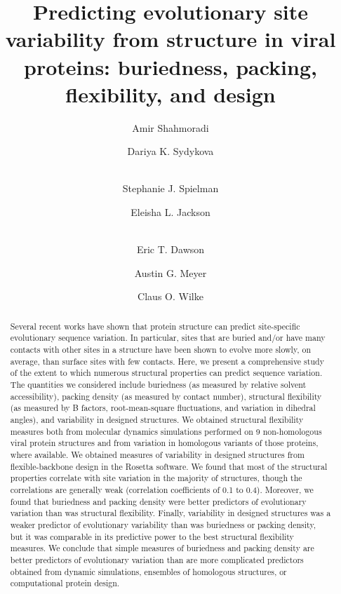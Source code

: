 \documentclass[smallextended]{svjour3}
\begin{document}
\title{Predicting evolutionary site variability from structure in viral proteins: buriedness, packing, flexibility, and design}

\author{Amir Shahmoradi \and Dariya K. Sydykova \and \\ Stephanie J. Spielman \and Eleisha L. Jackson \and \\ Eric T. Dawson \and Austin G. Meyer \and Claus O. Wilke}


\date{}

\maketitle

\begin{abstract}
Several recent works have shown that protein structure can predict site-specific evolutionary sequence variation. In particular, sites that are buried and/or have many contacts with other sites in a structure have been shown to evolve more slowly, on average, than surface sites with few contacts. Here, we present a comprehensive study of the extent to which numerous structural properties can predict sequence variation. The quantities we considered include buriedness (as measured by relative solvent accessibility), packing density (as measured by contact number), structural flexibility (as measured by B factors, root-mean-square fluctuations, and variation in dihedral angles), and variability in designed structures. We obtained structural flexibility measures both from molecular dynamics simulations performed on 9 non-homologous viral protein structures and from variation in homologous variants of those proteins, where available. We obtained measures of variability in designed structures from flexible-backbone design in the Rosetta software. We found that most of the structural properties correlate with site variation in the majority of structures, though the correlations are generally weak (correlation coefficients of 0.1 to 0.4). Moreover, we found that buriedness and packing density were better predictors of evolutionary variation than was structural flexibility. Finally, variability in designed structures was a weaker predictor of evolutionary variability than was buriedness or packing density, but it was comparable in its predictive power to the best structural flexibility measures. We conclude that simple measures of buriedness and packing density are better predictors of evolutionary variation than are more complicated predictors obtained from dynamic simulations, ensembles of homologous structures, or computational protein design.
\end{abstract}
\end{document}
